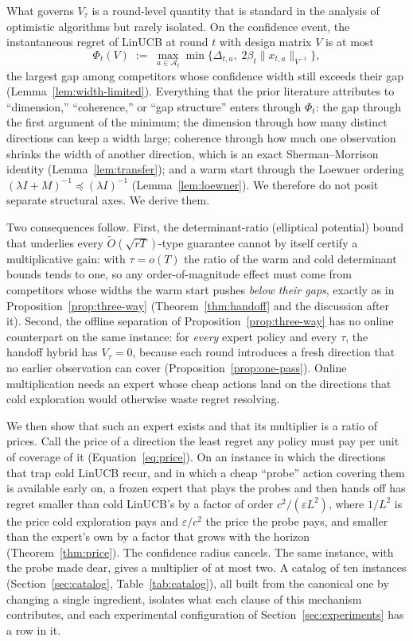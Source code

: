 \documentclass{article}
\theoremstyle{definition}
\theoremstyle{remark}
\newcommand{\eps}{\varepsilon}
\theoremstyle{remark}
\begin{document}
What governs $V_\tau$ is a round-level quantity that is standard in the
analysis of optimistic algorithms but rarely isolated. On the confidence event,
the instantaneous regret of LinUCB at round $t$ with design matrix $V$ is at
most
\[
\Phi_t(V)\;:=\;\max_{a\in\mathcal A_t}\min\bigl\{\Delta_{t,a},\;2\beta_t\|x_{t,a}\|_{V^{-1}}\bigr\},
\]
the largest gap among competitors whose confidence width still exceeds their
gap (Lemma~\ref{lem:width-limited}). Everything that the prior literature
attributes to ``dimension,'' ``coherence,'' or ``gap structure'' enters through
$\Phi_t$: the gap through the first argument of the minimum; the dimension
through how many distinct directions can keep a width large; coherence
through how much one observation shrinks the width of another direction, which
is an exact Sherman--Morrison identity (Lemma~\ref{lem:transfer}); and a warm
start through the Loewner ordering $(\lambda I+M)^{-1}\preceq(\lambda I)^{-1}$
(Lemma~\ref{lem:loewner}). We therefore do not posit separate structural axes.
We derive them.

Two consequences follow. First, the determinant-ratio (elliptical potential)
bound that underlies every $\widetilde O(\sqrt{rT})$-type guarantee cannot by
itself certify a multiplicative gain: with $\tau=o(T)$ the ratio of the warm
and cold determinant bounds tends to one, so any order-of-magnitude effect must
come from competitors whose widths the warm start pushes \emph{below their
gaps}, exactly as in Proposition~\ref{prop:three-way}
(Theorem~\ref{thm:handoff} and the discussion after it). Second, the offline
separation of Proposition~\ref{prop:three-way} has no online counterpart on
the same instance: for \emph{every} expert policy and every $\tau$, the
handoff hybrid has $V_\tau=0$, because each round introduces a fresh direction
that no earlier observation can cover (Proposition~\ref{prop:one-pass}). Online
multiplication needs an expert whose cheap actions land on the directions that
cold exploration would otherwise waste regret resolving.

We then show that such an expert exists and that its multiplier is a ratio
of prices. Call the price of a direction the least regret any policy must pay
per unit of coverage of it (Equation~\eqref{eq:price}). On an instance in which
the directions that trap cold LinUCB recur, and in which a cheap ``probe''
action covering them is available early on, a frozen expert that plays the
probes and then hands off has regret smaller than cold LinUCB's by a factor
of order $c^2/(\eps L^2)$, where $1/L^2$ is the price cold exploration pays and
$\eps/c^2$ the price the probe pays, and smaller than the expert's own by a
factor that grows with the horizon (Theorem~\ref{thm:price}). The confidence
radius cancels. The same instance, with the probe made dear, gives a
multiplier of at most two. A catalog of ten instances
(Section~\ref{sec:catalog}, Table~\ref{tab:catalog}), all built from the
canonical one by changing a single ingredient, isolates what each clause of
this mechanism contributes, and each experimental configuration of
Section~\ref{sec:experiments} has a row in it.
\end{document}
